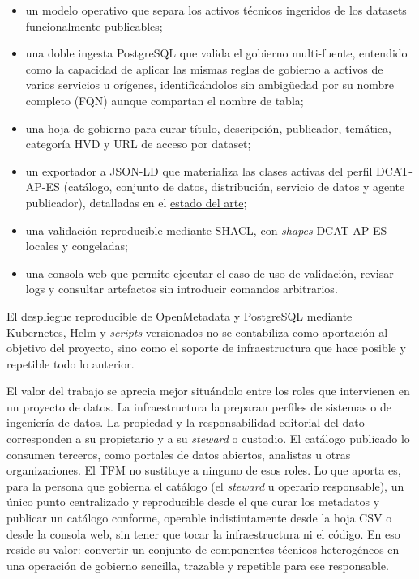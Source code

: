 \begin{itemize}
  \item un modelo operativo que separa los activos técnicos ingeridos de los datasets funcionalmente publicables;
  \item una doble ingesta PostgreSQL que valida el gobierno multi-fuente, entendido como la capacidad de aplicar las mismas reglas de gobierno a activos de varios servicios u orígenes, identificándolos sin ambigüedad por su nombre completo (FQN) aunque compartan el nombre de tabla;
  \item una hoja de gobierno para curar título, descripción, publicador, temática, categoría HVD y URL de acceso por dataset;
  \item un exportador a JSON-LD que materializa las clases activas del perfil DCAT-AP-ES (catálogo, conjunto de datos, distribución, servicio de datos y agente publicador), detalladas en el \hyperref[cap:estado-arte]{estado del arte};
  \item una validación reproducible mediante SHACL, con \emph{shapes} DCAT-AP-ES locales y congeladas;
  \item una consola web que permite ejecutar el caso de uso de validación, revisar logs y consultar artefactos sin introducir comandos arbitrarios.
\end{itemize}

El despliegue reproducible de OpenMetadata y PostgreSQL mediante Kubernetes, Helm y \emph{scripts} versionados no se contabiliza como aportación al objetivo del proyecto, sino como el soporte de infraestructura que hace posible y repetible todo lo anterior.

El valor del trabajo se aprecia mejor situándolo entre los roles que intervienen en un proyecto de datos. La infraestructura la preparan perfiles de sistemas o de ingeniería de datos. La propiedad y la responsabilidad editorial del dato corresponden a su propietario y a su \emph{steward} o custodio. El catálogo publicado lo consumen terceros, como portales de datos abiertos, analistas u otras organizaciones. El TFM no sustituye a ninguno de esos roles. Lo que aporta es, para la persona que gobierna el catálogo (el \emph{steward} u operario responsable), un único punto centralizado y reproducible desde el que curar los metadatos y publicar un catálogo conforme, operable indistintamente desde la hoja CSV o desde la consola web, sin tener que tocar la infraestructura ni el código. En eso reside su valor: convertir un conjunto de componentes técnicos heterogéneos en una operación de gobierno sencilla, trazable y repetible para ese responsable.

